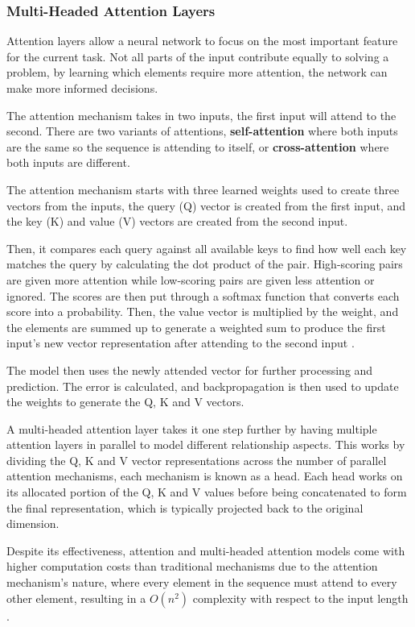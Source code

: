 \subsubsection{Multi-Headed Attention Layers}
Attention layers allow a neural network to focus on the most important feature for the current task. Not all parts of the input contribute equally to solving a problem, by learning which elements require more attention, the network can make more informed decisions. 

The attention mechanism takes in two inputs, the first input will attend to the second. There are two variants of attentions, \textbf{self-attention} where both inputs are the same so the sequence is attending to itself, or \textbf{cross-attention} where both inputs are different.

The attention mechanism starts with three learned weights used to create three vectors from the inputs, the query (Q) vector is created from the first input, and the key (K) and value (V) vectors are created from the second input. 

Then, it compares each query against all available keys to find how well each key matches the query by calculating the dot product of the pair. High-scoring pairs are given more attention while low-scoring pairs are given less attention or ignored. The scores are then put through a softmax function that converts each score into a probability. Then, the value vector is multiplied by the weight, and the elements are summed up to generate a weighted sum to produce the first input's new vector representation after attending to the second input \cite{AttentionIsAllYouNeed}.

The model then uses the newly attended vector for further processing and prediction. The error is calculated, and backpropagation is then used to update the weights to generate the Q, K and V vectors.

A multi-headed attention layer takes it one step further by having multiple attention layers in parallel to model different relationship aspects. This works by dividing the Q, K and V vector representations across the number of parallel attention mechanisms, each mechanism is known as a head. Each head works on its allocated portion of the Q, K and V values before being concatenated to form the final representation, which is typically projected back to the original dimension.

Despite its effectiveness, attention and multi-headed attention models come with higher computation costs than traditional mechanisms due to the attention mechanism's nature, where every element in the sequence must attend to every other element, resulting in a $O(n^2)$ complexity with respect to the input length \cite{AttentionComplexity}.



